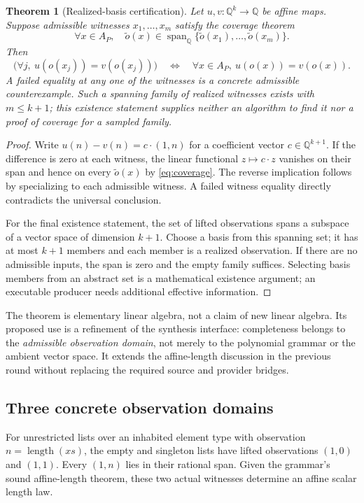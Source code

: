 \documentclass[11pt,a4paper]{article}
\newcommand{\Q}{\mathbb Q}
\newtheorem{theorem}{Theorem}[section]
\theoremstyle{definition}
\theoremstyle{remark}
\begin{document}
\begin{theorem}[Realized-basis certification]\label{thm:basis}
Let $u,v:\Q^k\to\Q$ be affine maps. Suppose admissible witnesses $x_1,\ldots,x_m$ satisfy the coverage theorem
\begin{equation}\label{eq:coverage}
 \forall x\in A_P,\quad
 \widetilde o(x)\in\operatorname{span}_{\Q}
 \{\widetilde o(x_1),\ldots,\widetilde o(x_m)\}.
\end{equation}
Then
\[
 \bigl(\forall j,\ u(o(x_j))=v(o(x_j))\bigr)
 \quad\Longleftrightarrow\quad
 \forall x\in A_P,\ u(o(x))=v(o(x)).
\]
A failed equality at any one of the witnesses is a concrete admissible counterexample. Such a spanning family of realized witnesses exists with $m\le k+1$; this existence statement supplies neither an algorithm to find it nor a proof of coverage for a sampled family.
\end{theorem}
\begin{proof}
Write $u(n)-v(n)=c\cdot(1,n)$ for a coefficient vector $c\in\Q^{k+1}$. If the difference is zero at each witness, the linear functional $z\mapsto c\cdot z$ vanishes on their span and hence on every $\widetilde o(x)$ by \eqref{eq:coverage}. The reverse implication follows by specializing to each admissible witness. A failed witness equality directly contradicts the universal conclusion.

For the final existence statement, the set of lifted observations spans a subspace of a vector space of dimension $k+1$. Choose a basis from this spanning set; it has at most $k+1$ members and each member is a realized observation. If there are no admissible inputs, the span is zero and the empty family suffices. Selecting basis members from an abstract set is a mathematical existence argument; an executable producer needs additional effective information.
\end{proof}

The theorem is elementary linear algebra, not a claim of new linear algebra. Its proposed use is a refinement of the synthesis interface: completeness belongs to the \emph{admissible observation domain}, not merely to the polynomial grammar or the ambient vector space. It extends the affine-length discussion in the previous round without replacing the required source and provider bridges.

\subsection{Three concrete observation domains}
For unrestricted lists over an inhabited element type with observation $n=\operatorname{length}(xs)$, the empty and singleton lists have lifted observations $(1,0)$ and $(1,1)$. Every $(1,n)$ lies in their rational span. Given the grammar's sound affine-length theorem, these two actual witnesses determine an affine scalar length law.
\end{document}
